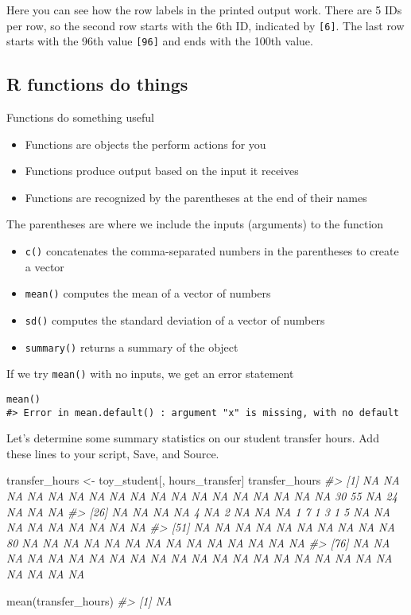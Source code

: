 \documentclass[
]{book}
\newenvironment{Shaded}{\begin{snugshade}}{\end{snugshade}}
\newcommand{\CommentTok}[1]{\textcolor[rgb]{0.56,0.35,0.01}{\textit{#1}}}
\newcommand{\FunctionTok}[1]{\textcolor[rgb]{0.00,0.00,0.00}{#1}}
\newcommand{\NormalTok}[1]{#1}
\newcommand{\OtherTok}[1]{\textcolor[rgb]{0.56,0.35,0.01}{#1}}
\providecommand{\tightlist}{%
  \setlength{\itemsep}{0pt}\setlength{\parskip}{0pt}}
\begin{document}
Here you can see how the row labels in the printed output work. There are 5 IDs per row, so the second row starts with the 6th ID, indicated by \texttt{{[}6{]}}. The last row starts with the 96th value \texttt{{[}96{]}} and ends with the 100th value.

\hypertarget{r-functions-do-things}{%
\subsection{R functions do things}\label{r-functions-do-things}}

Functions do something useful

\begin{itemize}
\tightlist
\item
  Functions are objects the perform actions for you
\item
  Functions produce output based on the input it receives
\item
  Functions are recognized by the parentheses at the end of their names
\end{itemize}

The parentheses are where we include the inputs (arguments) to the function

\begin{itemize}
\tightlist
\item
  \texttt{c()} concatenates the comma-separated numbers in the parentheses to create a vector
\item
  \texttt{mean()} computes the mean of a vector of numbers
\item
  \texttt{sd()} computes the standard deviation of a vector of numbers
\item
  \texttt{summary()} returns a summary of the object
\end{itemize}

If we try \texttt{mean()} with no inputs, we get an error statement

\begin{verbatim}
mean()
#> Error in mean.default() : argument "x" is missing, with no default
\end{verbatim}

Let's determine some summary statistics on our student transfer hours. Add these lines to your script, Save, and Source.

\begin{Shaded}
\begin{Highlighting}[]
\NormalTok{transfer\_hours }\OtherTok{\textless{}{-}}\NormalTok{ toy\_student[, hours\_transfer]}
\NormalTok{transfer\_hours}
\CommentTok{\#\textgreater{}   [1] NA NA NA NA NA NA NA NA NA NA NA NA NA NA NA NA NA NA 30 55 NA 24 NA NA NA}
\CommentTok{\#\textgreater{}  [26] NA NA NA NA  4 NA  2 NA NA NA  1  7  1  3  1  5 NA NA NA NA NA NA NA NA NA}
\CommentTok{\#\textgreater{}  [51] NA NA NA NA NA NA NA NA NA NA 80 NA NA NA NA NA NA NA NA NA NA NA NA NA NA}
\CommentTok{\#\textgreater{}  [76] NA NA NA NA NA NA NA NA NA NA NA NA NA NA NA NA NA NA NA NA NA NA NA NA NA}

\FunctionTok{mean}\NormalTok{(transfer\_hours)}
\CommentTok{\#\textgreater{} [1] NA}
\end{Highlighting}
\end{Shaded}
\end{document}
